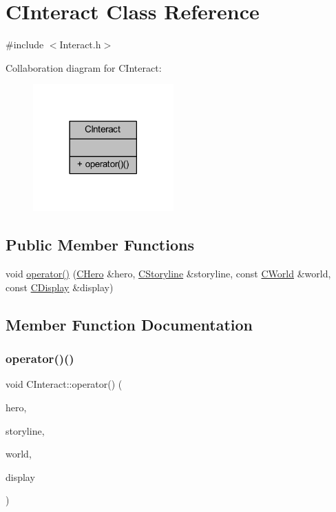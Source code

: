 \hypertarget{class_c_interact}{}\section{C\+Interact Class Reference}
\label{class_c_interact}


{\ttfamily \#include $<$Interact.\+h$>$}



Collaboration diagram for C\+Interact\+:\nopagebreak
\begin{figure}[H]
\begin{center}
\leavevmode
\includegraphics[width=153pt]{class_c_interact__coll__graph}
\end{center}
\end{figure}
\subsection*{Public Member Functions}
\begin{DoxyCompactItemize}
\item 
void \mbox{\hyperlink{class_c_interact_a9cfd2b170a9bed7f6a5a68b82c83d5bd}{operator()}} (\mbox{\hyperlink{class_c_hero}{C\+Hero}} \&hero, \mbox{\hyperlink{class_c_storyline}{C\+Storyline}} \&storyline, const \mbox{\hyperlink{class_c_world}{C\+World}} \&world, const \mbox{\hyperlink{class_c_display}{C\+Display}} \&display)
\end{DoxyCompactItemize}


\subsection{Member Function Documentation}
\mbox{\label{class_c_interact_a9cfd2b170a9bed7f6a5a68b82c83d5bd}} 
\subsubsection{\texorpdfstring{operator()()}{operator()()}}
{\footnotesize\ttfamily void C\+Interact\+::operator() (\begin{DoxyParamCaption}\item[{\mbox{\hyperlink{class_c_hero}{C\+Hero}} \&}]{hero,  }\item[{\mbox{\hyperlink{class_c_storyline}{C\+Storyline}} \&}]{storyline,  }\item[{const \mbox{\hyperlink{class_c_world}{C\+World}} \&}]{world,  }\item[{const \mbox{\hyperlink{class_c_display}{C\+Display}} \&}]{display }\end{DoxyParamCaption})}

